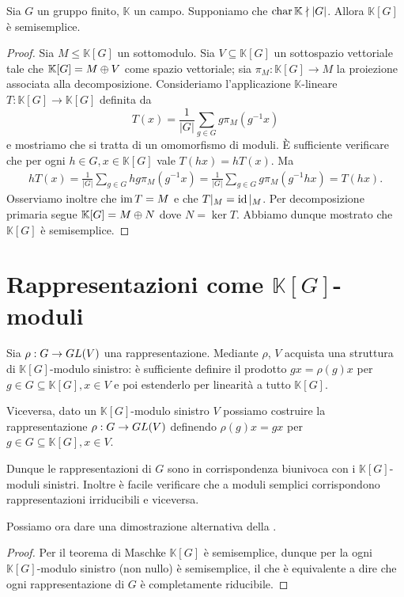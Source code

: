 \begin{proposition}
Sia $G$ un gruppo finito, $\mathbb{K}$ un campo. Supponiamo che $\operatorname{char}\mathbb{K}\nmid|G|$. Allora $\mathbb{K}[G]$ è semisemplice.
\end{proposition}
\begin{proof}
Sia $M\le\mathbb{K}[G]$ un sottomodulo. Sia $V\subseteq\mathbb{K}[G]$ un sottospazio vettoriale tale che $\mathbb{K}[G]=M\oplus V$ come spazio vettoriale; sia $\pi_M:\mathbb{K}[G]\to M$ la proiezione associata alla decomposizione. Consideriamo l'applicazione $\mathbb{K}$-lineare $T:\mathbb{K}[G]\to\mathbb{K}[G]$ definita da
$$
T(x)=\frac{1}{|G|}\sum_{g\in G}g\pi_M(g^{-1}x)
$$
e mostriamo che si tratta di un omomorfismo di moduli. È sufficiente verificare che per ogni $h\in G\comma x\in \mathbb{K}[G]$ vale $T(hx)=hT(x)$. Ma
\begin{align*}
hT(x)=\frac{1}{|G|}\sum_{g\in G}hg\pi_M(g^{-1}x)=\frac{1}{|G|}\sum_{g\in G}g\pi_M(g^{-1}hx)=T(hx).
\end{align*}
Osserviamo inoltre che $\operatorname{im} T=M$ e che $T|_M=\operatorname{id}|_M$. Per decomposizione primaria segue $\mathbb{K}[G]=M\oplus N$ dove $N=\ker T$. Abbiamo dunque mostrato che $\mathbb{K}[G]$ è semisemplice.
\end{proof}


\section{Rappresentazioni come $\mathbb{K}[G]$-moduli}


Sia $\rho:G\to GL(V)$ una rappresentazione. Mediante $\rho$, $V$ acquista una struttura di $\mathbb{K}[G]$-modulo sinistro: è sufficiente definire il prodotto $gx=\rho(g)x$ per $g\in G\subseteq\mathbb{K}[G]\comma x\in V$ e poi estenderlo per linearità a tutto $\mathbb{K}[G]$.

Viceversa, dato un $\mathbb{K}[G]$-modulo sinistro $V$ possiamo costruire la rappresentazione $\rho:G\to GL(V)$ definendo $\rho(g)x=gx$ per $g\in G\subseteq\mathbb{K}[G]\comma x\in V$.

Dunque le rappresentazioni di $G$ sono in corrispondenza biunivoca con i $\mathbb{K}[G]$-moduli sinistri. Inoltre è facile verificare che a moduli semplici corrispondono rappresentazioni irriducibili e viceversa.

Possiamo ora dare una dimostrazione alternativa della .
\representationfinitecompletelyreducible*
\begin{proof}
Per il teorema di Maschke $\mathbb{K}[G]$ è semisemplice, dunque per la  ogni $\mathbb{K}[G]$-modulo sinistro (non nullo) è semisemplice, il che è equivalente a dire che ogni rappresentazione di $G$ è completamente riducibile.
\end{proof}


